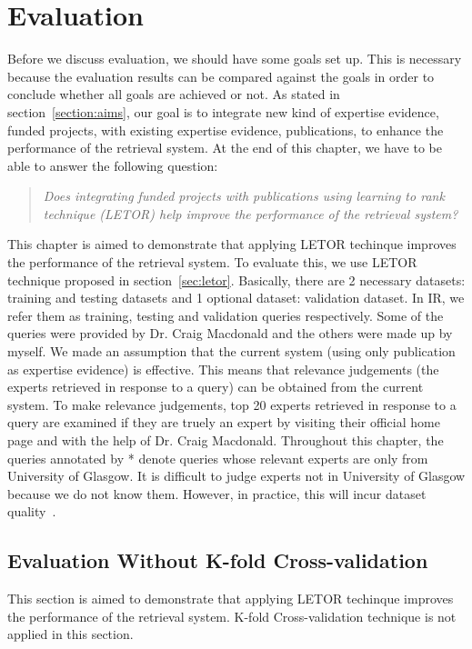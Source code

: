 
\chapter{Evaluation}\label{sec:evaluation}

Before we discuss evaluation, we should have some goals set up. This is necessary because the evaluation results can be compared against the goals in order to
conclude whether all goals are achieved or not. As stated in section~\ref{section:aims}, our goal is to integrate new kind of expertise evidence, funded projects,
with existing expertise evidence, publications, to enhance the performance of the retrieval system. At the end of this chapter, we have to be able to 
answer the following question:

\begin{quotation}
 \textit{Does integrating funded projects with publications using learning to rank technique (LETOR) help improve the performance of the retrieval system?}
\end{quotation}

This chapter is aimed to demonstrate that applying LETOR techinque improves the performance of the retrieval system. To evaluate this, we use LETOR
technique proposed in section~\ref{sec:letor}. Basically, there are 2 necessary datasets: training and testing datasets and 1 optional dataset:
validation dataset. In IR, 
we refer them as training, testing and validation queries respectively. 
Some of the queries were provided by Dr. Craig Macdonald and the others were made up by myself. 
We made an assumption that the current system (using only publication as expertise evidence) is effective. This means that relevance judgements 
(the experts retrieved in response to a query) can be obtained from the current system. To make relevance judgements, top 20 experts retrieved in response to a query
are examined if they are truely an expert by visiting their official home page and with the help of Dr. Craig Macdonald.
Throughout this chapter, the queries annotated by * denote queries whose relevant experts are only from University of Glasgow. 
It is difficult to judge experts not in University of Glasgow because we 
do not know them. However, in practice, this will incur dataset quality~\cite{craig}.


\section{Evaluation Without K-fold Cross-validation}
This section is aimed to demonstrate that applying LETOR techinque improves the performance of the retrieval system. K-fold Cross-validation technique
is not applied in this section.


